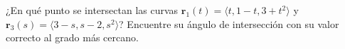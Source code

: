\item ¿En qué punto se intersectan las curvas $\mathbf{r}_1(t) = \langle t, 1-t, 3+t^2 \rangle$ y $\mathbf{r}_3(s) = \langle 3-s, s-2, s^2 \rangle$? Encuentre su ángulo de intersección con su valor correcto al grado más cercano.
